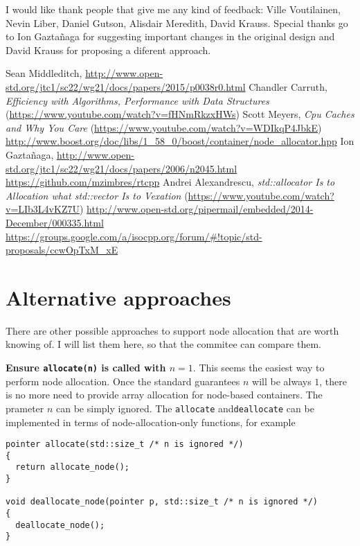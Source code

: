 \documentclass[11pt]{article}
\begin{document}
I would like thank people that give me any kind of feedback: Ville Voutilainen,
Nevin Liber, Daniel Gutson, Alisdair Meredith, David Krauss. Special thanks go
to Ion Gaztañaga for suggesting important changes in the original design and David 
Krauss for proposing a diferent approach.

\begin{thebibliography}{9}

   Sean Middleditch, \url{http://www.open-std.org/jtc1/sc22/wg21/docs/papers/2015/p0038r0.html}
   Chandler Carruth, {\it Efficiency with Algorithms, Performance
  with Data Structures} (\url{https://www.youtube.com/watch?v=fHNmRkzxHWs})
   Scott Meyers, {\it Cpu Caches and Why You Care} (\url{https://www.youtube.com/watch?v=WDIkqP4JbkE})
   \url{http://www.boost.org/doc/libs/1_58_0/boost/container/node_allocator.hpp}
   Ion Gazta\~ naga, \url{http://www.open-std.org/jtc1/sc22/wg21/docs/papers/2006/n2045.html}
   \url{https://github.com/mzimbres/rtcpp}
   Andrei Alexandrescu, {\it std::allocator Is to Allocation what
  std::vector Is to Vexation} (\url{https://www.youtube.com/watch?v=LIb3L4vKZ7U})
   \url{http://www.open-std.org/pipermail/embedded/2014-December/000335.html}
   \url{https://groups.google.com/a/isocpp.org/forum/#!topic/std-proposals/ccwOpTxM_xE}

\end{thebibliography}

\appendix

\section{Alternative approaches} \label{alternative}

There are other possible approaches to support node allocation that are worth knowing
of.  I will list them here, so that the commitee can compare them.

\medskip
\noindent
{\bf Ensure \texttt{allocate(n)} is called with $n = 1$}. This seems the easiest
way to perform node allocation. Once the standard guarantees $n$ will be always $1$,
there is no more need to provide array allocation for node-based containers. The
prameter $n$ can be simply ignored. The \texttt{allocate} and\texttt{deallocate}
can be implemented in terms of node-allocation-only functions, for example
\medskip
\begin{lstlisting}
pointer allocate(std::size_t /* n is ignored */)
{
  return allocate_node();
}

void deallocate_node(pointer p, std::size_t /* n is ignored */)
{
  deallocate_node();
}
\end{lstlisting}
\end{document}

